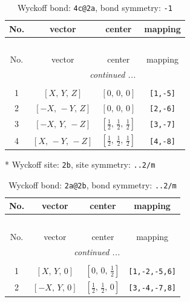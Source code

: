 \documentclass[fleqn,8pt]{jsarticle}
\begin{document}
\renewcommand{\arraystretch}{1.2}
\begin{longtable}{cccc}
\caption{Wyckoff bond: {\tt 4c@2a}, bond symmetry: {\tt -1}}
 \\
 \hline \hline
No. & vector & center & mapping \\ \hline \endfirsthead

\multicolumn{3}{l}{\tablename\ \thetable{}} \\
 \hline \hline
No. & vector & center & mapping \\ \hline \endhead

 \hline \hline
\multicolumn{3}{r}{\footnotesize\it continued ...} \\ \endfoot

 \hline \hline
\multicolumn{3}{r}{} \\ \endlastfoot

1 & $\left[ X,\, Y,\, Z \right]$ & $\left[ 0,\, 0,\, 0 \right]$ & {\tt [1,-5]} \\ \hline
2 & $\left[ - X,\, - Y,\, Z \right]$ & $\left[ 0,\, 0,\, 0 \right]$ & {\tt [2,-6]} \\ \hline
3 & $\left[ - X,\, Y,\, - Z \right]$ & $\left[ \frac{1}{2},\, \frac{1}{2},\, \frac{1}{2} \right]$ & {\tt [3,-7]} \\ \hline
4 & $\left[ X,\, - Y,\, - Z \right]$ & $\left[ \frac{1}{2},\, \frac{1}{2},\, \frac{1}{2} \right]$ & {\tt [4,-8]} \\
\end{longtable}
* Wyckoff site: {\tt 2b}, site symmetry: {\tt ..2/m}
\renewcommand{\arraystretch}{1.2}
\begin{longtable}{cccc}
\caption{Wyckoff bond: {\tt 2a@2b}, bond symmetry: {\tt ..2/m}}
 \\
 \hline \hline
No. & vector & center & mapping \\ \hline \endfirsthead

\multicolumn{3}{l}{\tablename\ \thetable{}} \\
 \hline \hline
No. & vector & center & mapping \\ \hline \endhead

 \hline \hline
\multicolumn{3}{r}{\footnotesize\it continued ...} \\ \endfoot

 \hline \hline
\multicolumn{3}{r}{} \\ \endlastfoot

1 & $\left[ X,\, Y,\, 0 \right]$ & $\left[ 0,\, 0,\, \frac{1}{2} \right]$ & {\tt [1,-2,-5,6]} \\ \hline
2 & $\left[ - X,\, Y,\, 0 \right]$ & $\left[ \frac{1}{2},\, \frac{1}{2},\, 0 \right]$ & {\tt [3,-4,-7,8]} \\
\end{longtable}
\end{document}
